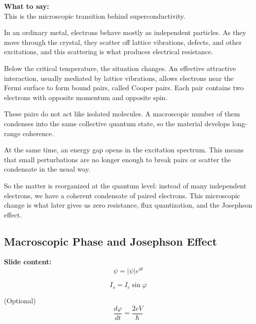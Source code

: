 \documentclass[11pt,a4paper]{article}
\newcommand{\points}[1]{{\color{accent}\textbf{Slide content:}}\\#1}
\newcommand{\speech}[1]{{\color{accent}\textbf{What to say:}}\\#1}
\begin{document}
\speech{
This is the microscopic transition behind superconductivity.

In an ordinary metal, electrons behave mostly as independent particles. As they move through the crystal, they scatter off lattice vibrations, defects, and other excitations, and this scattering is what produces electrical resistance.

Below the critical temperature, the situation changes. An effective attractive interaction, usually mediated by lattice vibrations, allows electrons near the Fermi surface to form bound pairs, called Cooper pairs. Each pair contains two electrons with opposite momentum and opposite spin.

These pairs do not act like isolated molecules. A macroscopic number of them condenses into the same collective quantum state, so the material develops long-range coherence.

At the same time, an energy gap opens in the excitation spectrum. This means that small perturbations are no longer enough to break pairs or scatter the condensate in the usual way.

So the matter is reorganized at the quantum level: instead of many independent electrons, we have a coherent condensate of paired electrons. This microscopic change is what later gives us zero resistance, flux quantization, and the Josephson effect.
}


\subsection{Macroscopic Phase and Josephson Effect}

\points{
\[
\psi = |\psi| e^{i\theta}
\]

\[
I_s = I_c \sin \varphi
\]

(Optional)
\[
\frac{d\varphi}{dt} = \frac{2eV}{\hbar}
\]
}
\end{document}
